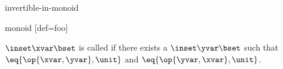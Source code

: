 \documentclass{stex}
\begin{document}
\begin{smodule}{invertible-in-monoid}
  
  \begin{extstructure*}{monoid}
    [def=foo]

    \begin{sdefinition}
      $\inset\xvar\bset$ is called  if there exists a
      $\inset\yvar\bset$ such that $\eq{\op{\xvar,\yvar},\unit}$ and
      $\eq{\op{\yvar,\xvar},\unit}$.
    \end{sdefinition}
  \end{extstructure*}
\end{smodule}
\end{document}
